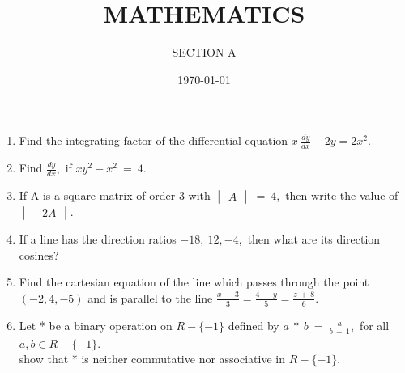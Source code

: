\documentclass[10pt,-letter paper]{article}
\title{MATHEMATICS}
\author{SECTION A}
\date{\today}
\providecommand{\brak}[1]{\ensuremath{\left(#1\right)}}
\newcommand{\mydet}[1]{\ensuremath{\begin{vmatrix}#1\end{vmatrix}}}
\begin{document}
\maketitle

\begin{enumerate}
\item Find the integrating factor of the differential equation ${x}~\frac{dy}{dx}-2{y}=2{x}^2$.
\item Find $\frac{dy}{dx}$,~if ${x}{y}^2-{x}^2$~=~$4$.
\item If A is a square matrix of order $3$ with $\mydet{A}~=~4$,~then write the value of $\mydet{-2A}$.
\item If a line has the direction ratios ${-18,~12,-4}$,~then what are its direction cosines?
\item Find the cartesian equation of the line which passes through the point $\brak{-2,4,-5}$ and is parallel to the line $\frac{{x}~+~{3}}{3}=\frac{{4}~-~{y}}{5}=\frac{{z}~+~{8}}{6}$.
\item Let * be a binary operation on $R-\{-1\}$ defined by $a~*~b~=~\frac{a}{{b}~+~{1}}$,~for all $a,b\in R-\{-1\}$. \\show that * is neither commutative nor associative in $R-\{-1\}$.


\end{enumerate}
\end{document}
